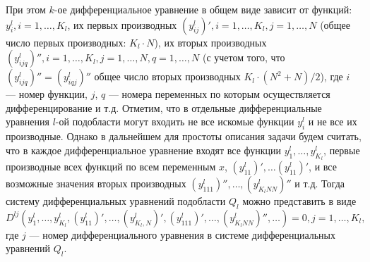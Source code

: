 \documentclass[a4paper,12pt]{article}
\begin{document}
При этом $k$-ое дифференциальное уравнение в общем виде зависит от функций:
$y^l_i, i = 1,\ldots,K_l$, их первых производных $(y^l_{ij})', i =
1,\ldots,K_l, j = 1, \ldots, N$ (общее число первых производных: $K_l \cdot
N$), их вторых производных $(y^l_{ijq})'', i = 1,\ldots,K_l, j =
1,\ldots,N, q = 1,\ldots,N$ (с учетом того, что $(y^l_{ijq})'' =
(y^l_{iqj})''$ общее число вторых производных $K_l \cdot (N^2+N) / 2$),
где $i$ --- номер функции, $j$, $q$ --- номера переменных по которым
осуществляется дифференцирование и т.д. Отметим, что в отдельные 
дифференциальные уравнения $l$-ой подобласти могут входить не все
искомые функции $y^l_i$ и не все их производные.  Однако в дальнейшем
для простоты описания задачи будем считать, что в каждое
дифференциальное уравнение входят все функции
$y^l_1,\ldots,y^l_{K_l}$, первые производные всех функций по всем
переменным $x$, $(y^l_{11})', \ldots (y^l_{11})'$, и все возможные
значения вторых производных $(y^l_{111})'', \ldots, (y^l_{K_lNN})''$ и
т.д. Тогда систему дифференциальных уравнений подобласти $Q_l$ можно
представить в виде
\begin{equation}
    D^{lj}(y^l_1,\ldots,y^l_{K_l}, (y^l_{11})',\ldots, (y^l_{K_l,N})',
           (y^l_{111})',\ldots, (y^l_{K_lNN})'',\ldots) = 0,
           j = 1, \ldots, K_l,
    \label{pde}
\end{equation}
где $j$ --- номер дифференциального уравнения в 
системе дифференциальных уравнений $Q_l$.
\end{document}
